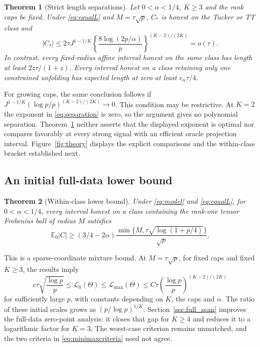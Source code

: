 \documentclass[11pt]{article}
\newtheorem{theorem}{Theorem}
\theoremstyle{remark}
\newcommand{\E}{\mathbb E}
\newcommand{\calL}{\mathcal L}
\begin{document}
\begin{theorem}[Strict length separations]\label{thm:separation}
Let $0<\alpha<1/4$, $K\ge3$ and the rank caps be fixed. Under \eqref{eq:equalL} and $M=\tau\sqrt p$, $C_*$ is honest on the Tucker or TT class and
\begin{equation}\label{eq:separation}
 |C_*|\le2\tau J^{1-1/K}
 \left\{\frac{8\log(2p/\alpha)}p\right\}^{(K-2)/(2K)}=o(\tau).
\end{equation}
In contrast, every fixed-radius affine interval honest on the same class has length at least $2z\tau/(1+z)$. Every interval honest on a class retaining only one constrained unfolding has expected length at zero at least $c_\alpha\tau/4$.
\end{theorem}

For growing caps, the same conclusion follows if $J^{1-1/K}(\log p/p)^{(K-2)/(2K)}\to0$. This condition may be restrictive. At $K=2$ the exponent in \eqref{eq:separation} is zero, so the argument gives no polynomial separation. Theorem~\ref{thm:separation} neither asserts that the displayed exponent is optimal nor compares favorably at every strong signal with an efficient oracle projection interval. Figure~\ref{fig:theory} displays the explicit comparisons and the within-class bracket established next.

\subsection{An initial full-data lower bound}\label{sec:gap}

\begin{theorem}[Within-class lower bound]\label{thm:jointlower}
Under \eqref{eq:model} and \eqref{eq:equalL}, for $0<\alpha<1/4$, every interval honest on a class containing the rank-one tensor Frobenius ball of radius $M$ satisfies
\begin{equation}\label{eq:jointlower}
 \E_0|C|\ge(3/4-2\alpha)
 \frac{\min\{M,\tau\sqrt{\log(1+p/4)}\}}{\sqrt p}.
\end{equation}
\end{theorem}

This is a sparse-coordinate mixture bound. At $M=\tau\sqrt p$, for fixed caps and fixed $K\ge3$, the results imply
\begin{equation}\label{eq:gap}
 c\tau\sqrt{\frac{\log p}p}
 \le\calL_0(\Theta)\le\calL_{\max}(\Theta)
 \le C\tau\left(\frac{\log p}p\right)^{(K-2)/(2K)}
\end{equation}
for sufficiently large $p$, with constants depending on $K$, the caps and $\alpha$. The ratio of these initial scales grows as $(p/\log p)^{1/K}$. Section~\ref{sec:full_scan} improves the full-data zero-point analysis: it closes that gap for $K\ge4$ and reduces it to a logarithmic factor for $K=3$. The worst-case criterion remains unmatched, and the two criteria in \eqref{eq:minimaxcriteria} need not agree.
\end{document}
